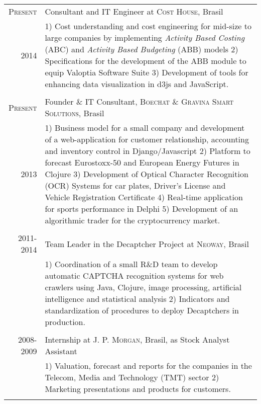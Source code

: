 \documentclass[a4paper,10pt]{article} %
\begin{document}
\begin{tabular}{r|p{11.5cm}}
  \textsc{Present} &
  Consultant and IT Engineer at \textsc{Cost House}, Brasil \\
  \textsc{2014} &
  \footnotesize{
  1) Cost understanding and cost
  engineering for mid-size to large companies by implementing \textit{Activity Based
  Costing} (ABC) and \textit{Activity Based Budgeting} (ABB) models
  2) Specifications for the development of the ABB module to equip Valoptia Software
  Suite
  3) Development of tools for enhancing data visualization in d3js and JavaScript. }\\
\multicolumn{2}{c}{} \\


\textsc{Present} &
Founder \& IT Consultant, \textsc{Boechat \&  Gravina Smart Solutions}, Brasil \\
\textsc{2013} &
\footnotesize{
  1) Business model for a small company and
  development of a web-application for
  customer relationship, accounting and inventory control in
  Django/Javascript
  2) Platform to forecast Eurostoxx-50 and European Energy Futures in
  Clojure
  3) Development of Optical Character Recognition (OCR) Systems for
  car plates, Driver's License and Vehicle Registration Certificate
  4) Real-time application for sports performance in Delphi
  5) Development of an algorithmic trader for the
  cryptocurrency market. 
  }
\\
\multicolumn{2}{c}{} \\


\textsc{2011-2014} &
Team Leader in the Decaptcher Project at
\textsc{Neoway}, Brasil \\
& \footnotesize{
  1) Coordination of a small R\&D team to develop automatic
  CAPTCHA recognition systems for web crawlers using Java, Clojure,
  image processing, artificial intelligence and statistical analysis
  2) Indicators and standardization of procedures to deploy Decaptchers in production.} \\
\multicolumn{2}{c}{} \\


\textsc{2008-2009} &
Internship at \textsc{J. P. Morgan}, Brasil, as Stock Analyst Assistant \\
& \footnotesize{
  1) Valuation, forecast and reports for the companies in the Telecom,
  Media and Technology (TMT) sector
  2) Marketing presentations and products for customers.}\\
\multicolumn{2}{c}{} \\


\end{tabular}
\end{document}
